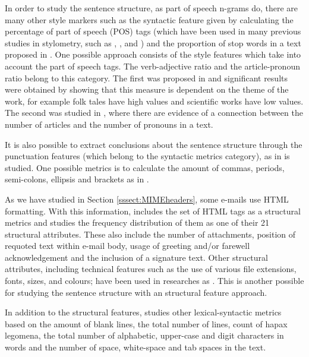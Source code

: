 In order to study the sentence structure, as part of speech n-grams do, there are many other style markers such as the syntactic feature given by calculating the percentage of part of speech (POS) tags (which have been used in many previous studies in stylometry, such as \cite{argamon1998style}, \cite{zhao2007searching}, \cite{ott2011finding} and \cite{cfgstylo}) and the proportion of stop words in a text proposed in \cite{ril2014determination}. One possible approach consists of the style features which take into account the part of speech tags. The verb-adjective ratio and the article-pronoun ratio belong to this category. The first was proposed in \cite{antosch1969diagnosis} and significant results were obtained by showing that this measure is dependent on the theme of the work, for example folk tales have high values and scientific works have low values. The second was studied in \cite{brainerd1974weighting}, where there are evidence of a connection between the number of articles and the number of pronouns in a text.

It is also possible to extract conclusions about the sentence structure through the punctuation features (which belong to the syntactic metrics category), as in \cite{baayen2002experiment} is studied. One possible metrics is to calculate the amount of commas, periods, semi-colons, ellipsis and brackets as in \cite{calix2008stylometry}.

As we have studied in Section \ref{sssect:MIMEheaders}, some e-mails use HTML formatting. With this information, \cite{de2001mining} includes the set of HTML tags as a structural metrics and studies the frequency distribution of them as one of their 21 structural attributes. These also include the number of attachments, position of requoted text within e-mail body, usage of greeting and/or farewell acknowledgement and the inclusion of a signature text. Other structural attributes, including technical features such as the use of various file extensions, fonts, sizes, and colours; have been used in researches as \cite{abbasi2005applying}. This is another possible for studying the sentence structure with an structural feature approach. 

In addition to the structural features, \cite{de2001mining} studies other lexical-syntactic metrics based on the amount of blank lines, the total number of lines, count of hapax legomena, the total number of alphabetic, upper-case and digit characters in words and the number of space, white-space and tab spaces in the text.

